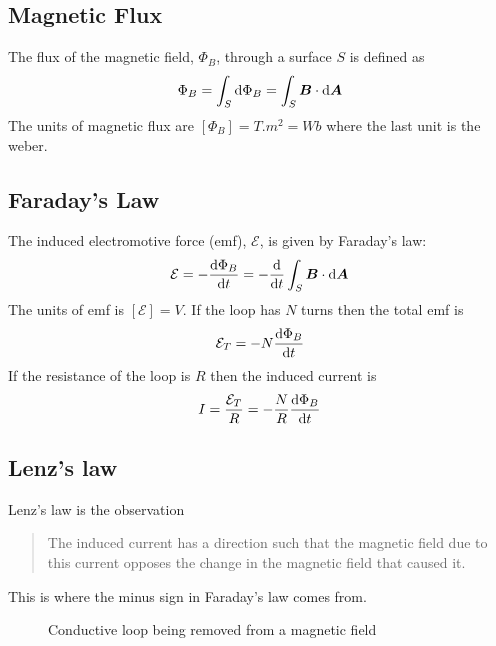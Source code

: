 \documentclass{article}
\newcommand{\emf}{\mathcal{E}}
\begin{document}
    \subsection{Magnetic Flux}
    The flux of the magnetic field, \(\Phi_B\), through a surface \(S\) is defined as
    \[\Phi_B = \int_S\dd\Phi_B = \int_S\bm{B}\cdot\dd\bm{A}\]
    The units of magnetic flux are \([\Phi_B] = \si{T.m^2} = \si{Wb}\) where the last unit is the weber.
    
    \subsection{Faraday's Law}
    The induced electromotive force (emf), \(\emf\), is given by Faraday's law:
    \[\emf = -\dv{\Phi_B}{t} = -\dv{t}\int_S\vv B\cdot\dd\vv A\]
    The units of emf is \([\emf] = \si{V}\).
    If the loop has \(N\) turns then the total emf is
    \[\emf_T = -N\dv{\Phi_B}{t}\]
    If the resistance of the loop is \(R\) then the induced current is
    \[I = \frac{\emf_T}{R} = -\frac{N}{R}\dv{\Phi_B}{t}\]
    
    \subsection{Lenz's law}
    Lenz's law is the observation
    \begin{quote}
        The induced current has a direction such that the magnetic field due to this current opposes the change in the magnetic field that caused it.
    \end{quote}
    This is where the minus sign in Faraday's law comes from.
    \begin{figure}[ht]
        \centering
        \caption{Conductive loop being removed from a magnetic field}
        \label{fig:loop removed from magnetic field}
    \end{figure}
\end{document}
